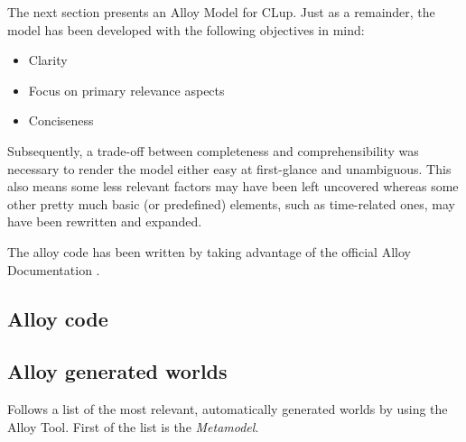 The next section presents an Alloy Model for CLup. Just as a remainder, the model has been developed with the following objectives in mind: \newline

\begin{itemize}
    \item Clarity
    \item Focus on primary relevance aspects
    \item Conciseness
\end{itemize}

Subsequently, a trade-off between completeness and comprehensibility was necessary to render the model either easy at first-glance and unambiguous. \newline 
This also means some less relevant factors may have been left uncovered whereas some other pretty much basic (or predefined) elements, such as time-related ones, may have been rewritten and expanded. \newline 

\noindent The alloy code has been written by taking advantage of the official Alloy Documentation \cite{Alloy:Docs}.\newline





\subsection{Alloy code \label{alloy_code}}




\subsection{Alloy generated worlds}
Follows a list of the most relevant, automatically generated worlds by using the Alloy Tool. First of the list is the \textit{Metamodel}.

